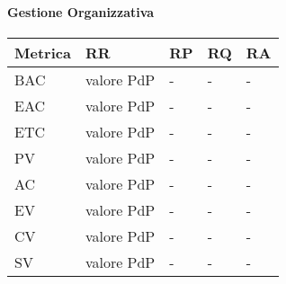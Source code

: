 \paragraph{Gestione Organizzativa}

\begin{longtable}{
		>{\centering}p{}
		>{\centering}p{}
		>{\centering}p{}
		>{\centering}p{}
		>{}p{} }

	\textbf{\color{white}Metrica} &
	\textbf{\color{white}RR} &
	\textbf{\color{white}RP} &
	\textbf{\color{white}RQ} &
	\textbf{\color{white}RA}
	\tabularnewline
	\endhead

	BAC & valore PdP & - & - & - \\
	EAC & valore PdP & - & - & - \\
	ETC & valore PdP & - & - & - \\
	PV & valore PdP & - & - & - \\
	AC & valore PdP & - & - & - \\
	EV & valore PdP & - & - & - \\
	CV & valore PdP & - & - & - \\
	SV & valore PdP & - & - & - \\
\end{longtable}